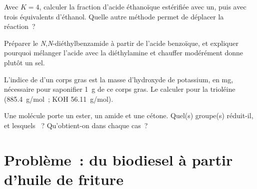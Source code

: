 \begin{exercise}[$\star\star$]\label{exo:b2:acyl-substitution:9}
Avec $K = 4$, calculer la fraction d'acide éthanoïque estérifiée avec un, puis avec trois
équivalents d'éthanol. Quelle autre méthode permet de déplacer la réaction~?
\end{exercise}

\begin{exercise}[$\star\star\star$]\label{exo:b2:acyl-substitution:10}
Préparer le \textit{N},\textit{N}-diéthylbenzamide à partir de l'acide benzoïque, et expliquer
pourquoi mélanger l'acide avec la diéthylamine et chauffer modérément donne plutôt un sel.
\end{exercise}

\begin{exercise}[$\star\star\star$]\label{exo:b2:acyl-substitution:11}
L'indice de  d'un corps gras est la masse d'hydroxyde de potassium, en mg, nécessaire
pour saponifier \qty{1}{g} de ce corps gras. Le calculer pour la trioléine (\qty{885.4}{g/mol}~; KOH \qty{56.11}{g/mol}).
\end{exercise}

\begin{exercise}[$\star\star\star$]\label{exo:b2:acyl-substitution:12}
Une molécule porte un ester, un amide et une cétone. Quel(s) groupe(s)  réduit-il, et
lesquels ~? Qu'obtient-on dans chaque cas~?
\end{exercise}

\section{Problème~: du biodiesel à partir d'huile de friture}

